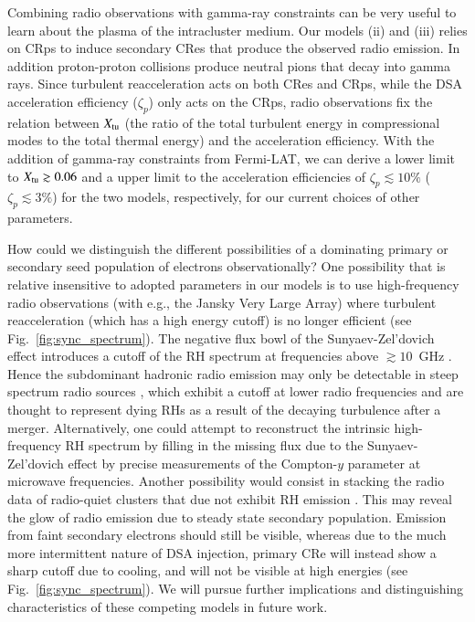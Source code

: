 \documentclass[useAMS,usenatbib]{mn2e}
\begin{document}
Combining radio observations with gamma-ray constraints can be very
useful to learn about the plasma of the intracluster medium. Our
models (ii) and (iii) relies on CRps to induce secondary CRes that
produce the observed radio emission. In addition proton-proton
collisions produce neutral pions that decay into gamma rays. Since
turbulent reacceleration acts on both CRes and CRps, while the DSA
acceleration efficiency ($\zeta_p$) only acts on the CRps, radio
observations fix the relation between $X_{\mathrm{tu}}$ (the ratio of the
total turbulent energy in compressional modes to the total thermal
energy) and the acceleration efficiency. With the addition of
gamma-ray constraints from Fermi-LAT, we can derive a lower limit to
$X_{\mathrm{tu}}\gtrsim0.06$ and a upper limit to the acceleration
efficiencies of $\zeta_p\lesssim 10\%$ ($\zeta_p\lesssim 3\%$) for
the two models, respectively, for our current choices of other
parameters.

How could we distinguish the different possibilities of a dominating
primary or secondary seed population of electrons observationally?
One possibility that is relative insensitive to adopted parameters in
our models is to use high-frequency radio observations (with e.g., the
Jansky Very Large Array) where turbulent reacceleration (which has a
high energy cutoff) is no longer efficient (see
Fig.~\ref{fig:sync_spectrum}). The negative flux bowl of the
Sunyaev-Zel'dovich effect introduces a cutoff of the RH spectrum at
frequencies above $\gtrsim 10$~GHz \citep[][ depending on cluster mass
  and redshift]{2002A&A...396L..17E,Pfrommer:2003mk}. Hence the
subdominant hadronic radio emission may only be detectable in steep
spectrum radio sources \citep{2008Natur.455..944B}, which exhibit a
cutoff at lower radio frequencies and are thought to represent dying
RHs as a result of the decaying turbulence after a
merger. Alternatively, one could attempt to reconstruct the intrinsic
high-frequency RH spectrum by filling in the missing flux due to the
Sunyaev-Zel'dovich effect by precise measurements of the Compton-$y$
parameter at microwave frequencies. Another possibility would consist
in stacking the radio data of radio-quiet clusters that due not
exhibit RH emission \citep{2011ApJ...740L..28B}. This may reveal the
glow of radio emission due to steady state secondary
population. Emission from faint secondary electrons should still be
visible, whereas due to the much more intermittent nature of DSA
injection, primary CRe will instead show a sharp cutoff due to
cooling, and will not be visible at high energies (see
Fig.~\ref{fig:sync_spectrum}). We will pursue further implications and
distinguishing characteristics of these competing models in future
work.
\end{document}
